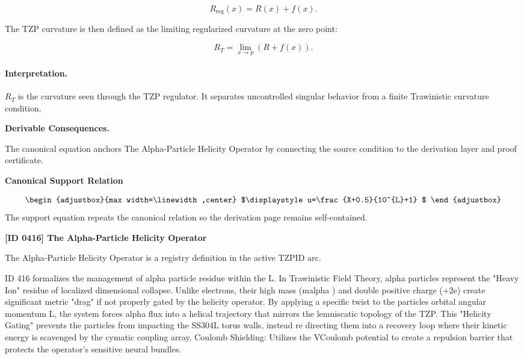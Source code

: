 \begin{equation}
R_{\mathrm{reg}}(x)=R(x)+f(x).
\end{equation}

The TZP curvature is then defined as the limiting regularized curvature at the zero point:

\begin{equation}
\boxed{
R_T
=
\lim_{x\to p}
\left(
R+f(x)
\right).
}
\end{equation}

\paragraph{Interpretation.}
$R_T$ is the curvature seen through the TZP regulator. It separates uncontrolled singular behavior from a finite Trawinistic curvature condition.

\par\vspace{0.35em}
\noindent\textbf{Derivable Consequences.}\quad
\begingroup
\footnotesize
\raggedright
The canonical equation anchors The Alpha-Particle Helicity Operator by connecting the source condition to the derivation layer and proof certificate.
\par\endgroup

\noindent\textbf{Canonical Support Relation}\par
\[
\begin{adjustbox}{max width=\linewidth,center}
$\displaystyle
u=\frac{X+0.5}{10^{L}+1}
$
\end{adjustbox}
\]
\noindent The support equation repeats the canonical relation so the derivation page remains self-contained.\par

\clearpage
\noindent\textbf{[ID 0416] The Alpha-Particle Helicity Operator}\par
\vspace{0.35em}
\begingroup\small
{}
The Alpha-Particle Helicity Operator is a registry definition in the active TZPID arc.

ID 416 formalizes the management of alpha particle residue within the L. In Trawinistic Field Theory, alpha particles represent the "Heavy Ion" residue of localized dimensional collapse. Unlike electrons, their high mass (malpha ) and double positive charge (+2e) create significant metric "drag" if not properly gated by the helicity operator. By applying a specific twist to the particles orbital angular momentum L, the system forces alpha flux into a helical trajectory that mirrors the lemniscatic topology of the TZP. This "Helicity Gating" prevents the particles from impacting the SS304L torus walls, instead re directing them into a recovery loop where their kinetic energy is scavenged by the cymatic coupling array. Coulomb Shielding: Utilizes the VCoulomb potential to create a repulsion barrier that protects the operator's sensitive neural bundles.

